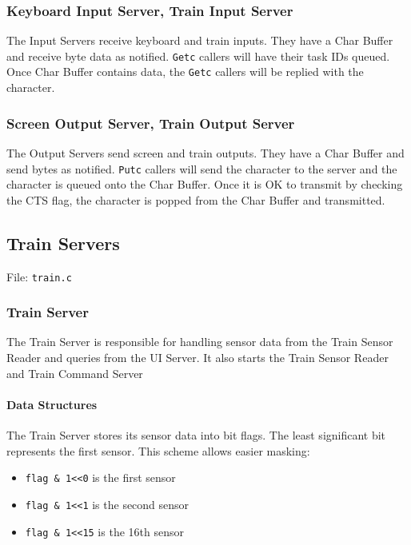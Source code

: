 \documentclass[letterpaper]{article}
\begin{document}
\subsubsection{Keyboard Input Server, Train Input Server%
  \label{keyboard-input-server-train-input-server}%
}

The Input Servers receive keyboard and train inputs. They have a Char Buffer and receive byte data as notified. \texttt{Getc} callers will have their task IDs queued. Once Char Buffer contains data, the \texttt{Getc} callers will be replied with the character.


\subsubsection{Screen Output Server, Train Output Server%
  \label{screen-output-server-train-output-server}%
}

The Output Servers send screen and train outputs. They have a Char Buffer and send bytes as notified. \texttt{Putc} callers will send the character to the server and the character is queued onto the Char Buffer. Once it is OK to transmit by checking the CTS flag, the character is popped from the Char Buffer and transmitted.


\subsection{Train Servers%
  \label{train-servers}%
}

File: \texttt{train.c}


\subsubsection{Train Server%
  \label{train-server}%
}

The Train Server is responsible for handling sensor data from the Train Sensor Reader and queries from the UI Server. It also starts the Train Sensor Reader and Train Command Server


\paragraph{Data Structures%
  \label{id2}%
}

The Train Server stores its sensor data into bit flags. The least significant bit represents the first sensor. This scheme allows easier masking:
%
\begin{itemize}

\item \texttt{flag \& 1<{}<0} is the first sensor

\item \texttt{flag \& 1<{}<1} is the second sensor

\item \texttt{flag \& 1<{}<15} is the 16th sensor

\end{itemize}
\end{document}
